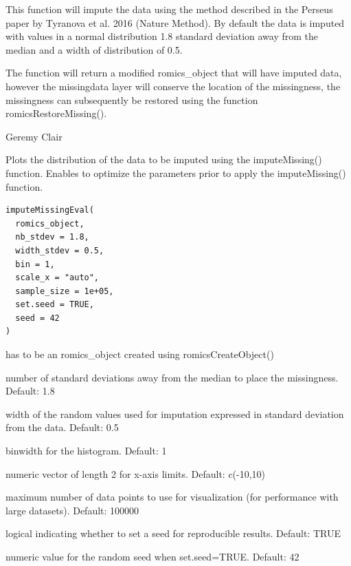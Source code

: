 \documentclass[a4paper]{book}
\begin{document}
%
\begin{Details}
This function will impute the data using the method described in the Perseus paper by Tyranova et al. 2016 (Nature Method). By default the data is imputed with values in a normal distribution 1.8 standard deviation away from the median and a width of distribution of 0.5.
\end{Details}
%
\begin{Value}
The function will return a modified romics\_object that will have imputed data, however the missingdata layer will conserve the location of the missingness, the missingness can subsequently be restored using the function romicsRestoreMissing().
\end{Value}
%
\begin{Author}
Geremy Clair
\end{Author}
%
\begin{Description}
Plots the distribution of the data to be imputed using the imputeMissing() function. Enables  to optimize the parameters prior to apply the imputeMissing() function.
\end{Description}
%
\begin{Usage}
\begin{verbatim}
imputeMissingEval(
  romics_object,
  nb_stdev = 1.8,
  width_stdev = 0.5,
  bin = 1,
  scale_x = "auto",
  sample_size = 1e+05,
  set.seed = TRUE,
  seed = 42
)
\end{verbatim}
\end{Usage}
%
\begin{Arguments}
\begin{ldescription}
\item[\code{romics\_object}] has to be an romics\_object created using romicsCreateObject()

\item[\code{nb\_stdev}] number of standard deviations away from the median to place the missingness. Default: 1.8

\item[\code{width\_stdev}] width of the random values used for imputation expressed in standard deviation from the data. Default: 0.5

\item[\code{bin}] binwidth for the histogram. Default: 1

\item[\code{scale\_x}] numeric vector of length 2 for x-axis limits. Default: c(-10,10)

\item[\code{sample\_size}] maximum number of data points to use for visualization (for performance with large datasets). Default: 100000

\item[\code{set.seed}] logical indicating whether to set a seed for reproducible results. Default: TRUE

\item[\code{seed}] numeric value for the random seed when set.seed=TRUE. Default: 42
\end{ldescription}
\end{Arguments}
\end{document}
